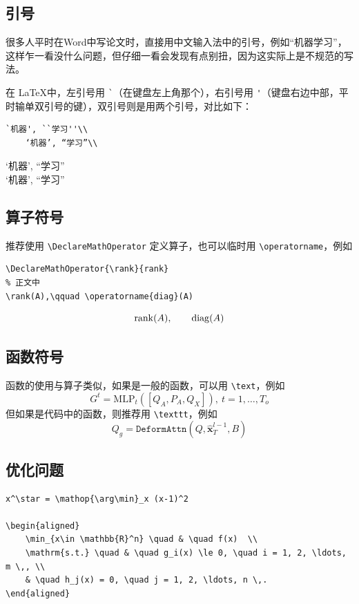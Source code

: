 \documentclass[11pt,a4paper,UTF8]{ctexart}
\begin{document}
\subsection{引号}
很多人平时在Word中写论文时，直接用中文输入法中的引号，例如“机器学习”，这样乍一看没什么问题，但仔细一看会发现有点别扭，因为这实际上是不规范的写法。

在 \LaTeX 中，左引号用 \verb|`|（在键盘左上角那个），右引号用 \verb|'|（键盘右边中部，平时输单双引号的键），双引号则是用两个引号，对比如下：
\begin{lstlisting}[style=latex]
    `机器', ``学习''\\
    ‘机器’, “学习”\\
\end{lstlisting}
\begin{center}
    `机器', ``学习''\\
    ‘机器’, “学习”\\
\end{center}

\subsection{算子符号}
推荐使用 \verb|\DeclareMathOperator| 定义算子，也可以临时用 \verb|\operatorname|，例如
\begin{lstlisting}[style=latex]
% 放在导言区
\DeclareMathOperator{\rank}{rank}
% 正文中
\rank(A),\qquad \operatorname{diag}(A)
\end{lstlisting}
\begin{equation*}
    \rank(A),\qquad \operatorname{diag}(A)
\end{equation*}

\subsection{函数符号}
函数的使用与算子类似，如果是一般的函数，可以用 \verb|\text|，例如
\begin{equation*}
    G^t = \text{MLP}_{t}([Q_{A}, P_{A}, Q_{X}]),\ t={1,\dots,T_o}
\end{equation*}
但如果是代码中的函数，则推荐用 \verb|\texttt|，例如
\begin{equation*}
    Q_{g} = \texttt{DeformAttn}(Q, \hat{\mathbf{x}}_{T}^{l-1}, B)
\end{equation*}

\subsection{优化问题}
\begin{lstlisting}[style=latex]
x^\star = \mathop{\arg\min}_x (x-1)^2

\begin{aligned}
    \min_{x\in \mathbb{R}^n} \quad & \quad f(x)  \\
    \mathrm{s.t.} \quad & \quad g_i(x) \le 0, \quad i = 1, 2, \ldots, m \,, \\
    & \quad h_j(x) = 0, \quad j = 1, 2, \ldots, n \,. 
\end{aligned}
\end{lstlisting}
\end{document}
